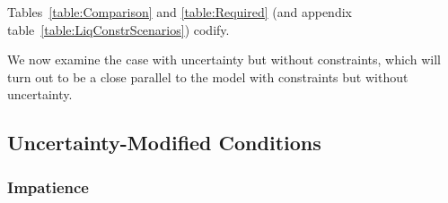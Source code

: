 \documentclass[BufferStockTheory]{subfiles}
\begin{document}
\hypertarget{RelatePFGICFHWCRICPFFVACText}{}
Tables~\ref{table:Comparison} and \ref{table:Required} (and appendix table~\ref{table:LiqConstrScenarios}) codify. 

We now examine the case with uncertainty but without constraints, which will turn out to be a close parallel to the model with constraints but without uncertainty.

\hypertarget{Uncertainty-Modified-Conditions}{}
\subsection{Uncertainty-Modified Conditions}\label{subsec:UncertaintyModifiedConditions}
\subsubsection{Impatience}
\end{document}
